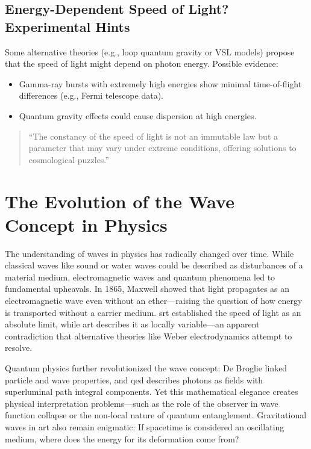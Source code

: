 \subsection{Energy-Dependent Speed of Light? Experimental Hints}
Some alternative theories (e.g., loop quantum gravity or VSL models) propose that the speed of light might depend on photon energy.
Possible evidence:

\begin{itemize}
    \item Gamma-ray bursts with extremely high energies show minimal time-of-flight differences (e.g., Fermi telescope data).
    \item Quantum gravity effects could cause dispersion at high energies.
\end{itemize}

\begin{quote}
    \enquote{The constancy of the speed of light is not an immutable law but a parameter that may vary under extreme conditions, offering solutions to cosmological puzzles.} \cite{Magueijo2003}
\end{quote}

\section{The Evolution of the Wave Concept in Physics}
The understanding of waves in physics has radically changed over time. While classical waves like sound or water waves could be described as disturbances of a material medium,
electromagnetic waves and quantum phenomena led to fundamental upheavals. In 1865, Maxwell showed that light propagates as an electromagnetic wave
even without an ether—raising the question of how energy is transported without a carrier medium. \gls{srt} established the speed of light
as an absolute limit, while \gls{art} describes it as locally variable—an apparent contradiction that alternative theories like Weber electrodynamics
attempt to resolve.

Quantum physics further revolutionized the wave concept: De Broglie linked particle and wave properties, and \gls{qed} describes photons as fields with superluminal
path integral components. Yet this mathematical elegance creates physical interpretation problems—such as the role of the observer in wave function collapse or the non-local
nature of quantum entanglement. Gravitational waves in \gls{art} also remain enigmatic: If spacetime is considered an oscillating medium, where does the energy for its deformation come from?


